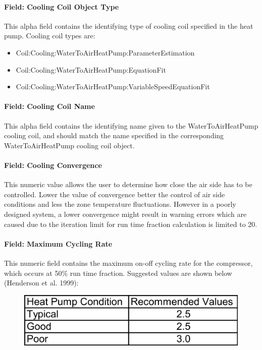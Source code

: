 \paragraph{Field: Cooling Coil Object Type}\label{field-cooling-coil-object-type-5}

This alpha field contains the identifying type of cooling coil specified in the heat pump. Cooling coil types are:

\begin{itemize}
\item
  Coil:Cooling:WaterToAirHeatPump:ParameterEstimation
\item
  Coil:Cooling:WaterToAirHeatPump:EquationFit
\item
  Coil:Cooling:WaterToAirHeatPump:VariableSpeedEquationFit
\end{itemize}

\paragraph{Field: Cooling Coil Name}\label{field-cooling-coil-name-5}

This alpha field contains the identifying name given to the WaterToAirHeatPump cooling coil, and should match the name specified in the corresponding WaterToAirHeatPump cooling coil object.

\paragraph{Field: Cooling Convergence}\label{field-cooling-convergence}

This numeric value allows the user to determine how close the air side has to be controlled. Lower the value of convergence better the control of air side conditions and less the zone temperature fluctuations. However in a poorly designed system, a lower convergence might result in warning errors which are caused due to the iteration limit for run time fraction calculation is limited to 20.

\paragraph{Field: Maximum Cycling Rate}\label{field-maximum-cycling-rate-1-000}

This numeric field contains the maximum on-off cycling rate for the compressor, which occurs at 50\% run time fraction. Suggested values are shown below (Henderson et al. 1999):

\begin{figure}[htbp]
\centering
\includegraphics{media/image305.png}
\caption{}
\end{figure}

